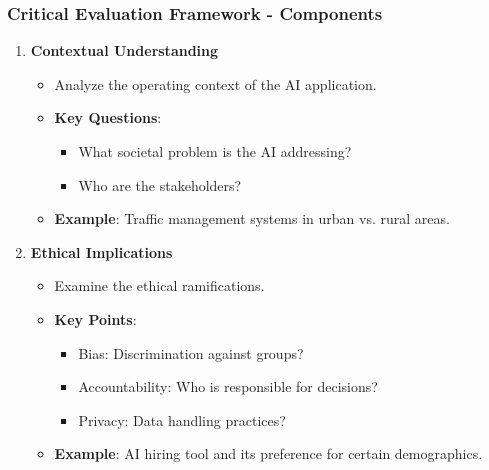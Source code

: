 \documentclass[aspectratio=169]{beamer}
\begin{document}
\begin{frame}[fragile]
    \frametitle{Critical Evaluation Framework - Components}
    \begin{enumerate}
        \item \textbf{Contextual Understanding}
            \begin{itemize}
                \item Analyze the operating context of the AI application.
                \item \textbf{Key Questions}:
                    \begin{itemize}
                        \item What societal problem is the AI addressing?
                        \item Who are the stakeholders?
                    \end{itemize}
                \item \textbf{Example}: Traffic management systems in urban vs. rural areas.
            \end{itemize}
        \item \textbf{Ethical Implications}
            \begin{itemize}
                \item Examine the ethical ramifications.
                \item \textbf{Key Points}:
                    \begin{itemize}
                        \item Bias: Discrimination against groups?
                        \item Accountability: Who is responsible for decisions?
                        \item Privacy: Data handling practices?
                    \end{itemize}
                \item \textbf{Example}: AI hiring tool and its preference for certain demographics.
            \end{itemize}
    \end{enumerate}
\end{frame}
\end{document}
